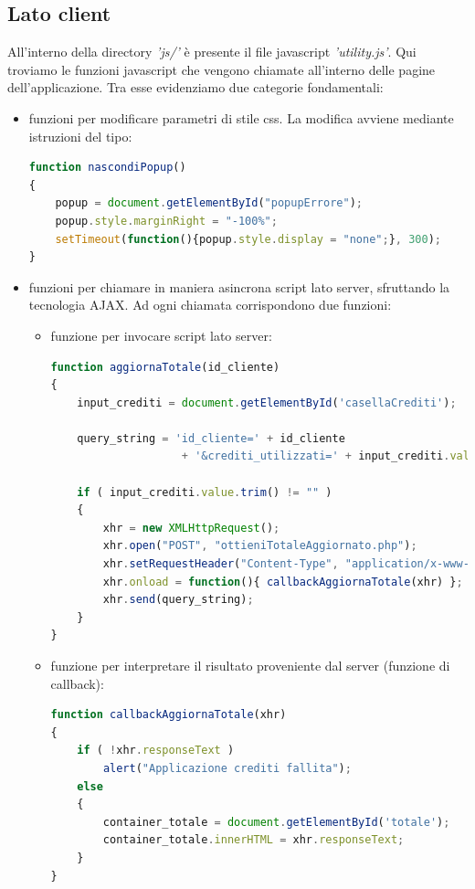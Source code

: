 \documentclass[a4paper, 14pt]{article}
\begin{document}
\begin{flushleft}
		\subsection{Lato client}
			All'interno della directory \textit{'js/'} è presente il file javascript \textit{'utility.js'}.
			Qui troviamo le funzioni javascript che vengono chiamate all'interno delle pagine dell'applicazione.
			Tra esse evidenziamo due categorie fondamentali:
			\begin{itemize}
				\item funzioni per modificare parametri di stile css. La modifica avviene mediante istruzioni del tipo:
				\begin{lstlisting}[backgroundcolor=\color{coloreSfondoGrammatiche}, language=javascript]
function nascondiPopup()
{
	popup = document.getElementById("popupErrore");
	popup.style.marginRight = "-100%";
	setTimeout(function(){popup.style.display = "none";}, 300);
}
				\end{lstlisting}
				\item funzioni per chiamare in maniera asincrona script lato server, sfruttando la tecnologia AJAX. Ad ogni chiamata corrispondono due funzioni:
					\begin{itemize}
						\item funzione per invocare script lato server:
						\begin{lstlisting}[backgroundcolor=\color{coloreSfondoGrammatiche}, language=javascript]
function aggiornaTotale(id_cliente)
{
	input_crediti = document.getElementById('casellaCrediti');
	
	query_string = 'id_cliente=' + id_cliente 
					+ '&crediti_utilizzati=' + input_crediti.value.trim();
	
	if ( input_crediti.value.trim() != "" )
	{
		xhr = new XMLHttpRequest();
		xhr.open("POST", "ottieniTotaleAggiornato.php");
		xhr.setRequestHeader("Content-Type", "application/x-www-form-urlencoded");
		xhr.onload = function(){ callbackAggiornaTotale(xhr) };
		xhr.send(query_string);
	}
}
						\end{lstlisting}
						\item funzione per interpretare il risultato proveniente dal server (funzione di callback):
						\begin{lstlisting}[backgroundcolor=\color{coloreSfondoGrammatiche}, language=javascript]
function callbackAggiornaTotale(xhr)
{
	if ( !xhr.responseText )
		alert("Applicazione crediti fallita");
	else
	{
		container_totale = document.getElementById('totale');
		container_totale.innerHTML = xhr.responseText;
	}
}
						\end{lstlisting}
					\end{itemize}
			\end{itemize}
			\newpage

\end{flushleft}
\end{document}
